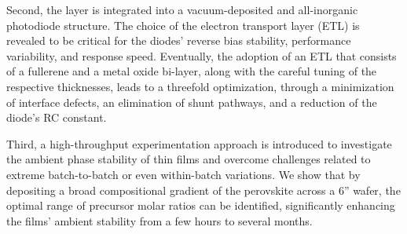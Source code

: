 Second, the  layer is integrated into a vacuum-deposited and all-inorganic photodiode structure. The choice of the electron transport layer (ETL) is revealed to be critical for the diodes' reverse bias stability, performance variability, and response speed. Eventually, the adoption of an ETL that consists of a fullerene and a metal oxide bi-layer, along with the careful tuning of the respective thicknesses, leads to a threefold optimization, through a minimization of interface defects, an elimination of shunt pathways, and a reduction of the diode's RC constant. 

Third, a high-throughput experimentation approach is introduced to investigate the ambient phase stability of  thin films and overcome challenges related to extreme batch-to-batch or even within-batch variations. We show that by depositing a broad compositional gradient of the perovskite across a 6'' wafer, the optimal range of precursor molar ratios can be identified, significantly enhancing the films' ambient stability from a few hours to several months.

\cleardoublepage

